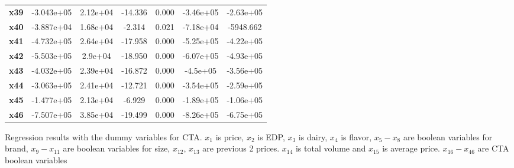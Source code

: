 \documentclass{article}
\begin{document}
\begin{center}
{\begin{tabular}{lcccccc}
\textbf{x39}   &   -3.043e+05  &     2.12e+04     &   -14.336  &         0.000        &    -3.46e+05    &    -2.63e+05     \\
\textbf{x40}   &   -3.887e+04  &     1.68e+04     &    -2.314  &         0.021        &    -7.18e+04    &    -5948.662     \\
\textbf{x41}   &   -4.732e+05  &     2.64e+04     &   -17.958  &         0.000        &    -5.25e+05    &    -4.22e+05     \\
\textbf{x42}   &   -5.503e+05  &      2.9e+04     &   -18.950  &         0.000        &    -6.07e+05    &    -4.93e+05     \\
\textbf{x43}   &   -4.032e+05  &     2.39e+04     &   -16.872  &         0.000        &     -4.5e+05    &    -3.56e+05     \\
\textbf{x44}   &   -3.063e+05  &     2.41e+04     &   -12.721  &         0.000        &    -3.54e+05    &    -2.59e+05     \\
\textbf{x45}   &   -1.477e+05  &     2.13e+04     &    -6.929  &         0.000        &    -1.89e+05    &    -1.06e+05     \\
\textbf{x46}   &   -7.507e+05  &     3.85e+04     &   -19.499  &         0.000        &    -8.26e+05    &    -6.75e+05     \\
\bottomrule
\end{tabular}}
\caption{Regression results with the dummy variables for CTA. $x_1$ is price, $x_2$ is EDP, $x_3$ is dairy, $x_4$ is flavor, $x_5-x_8$ are boolean variables for brand, $x_9-x_{11}$ are boolean variables for size, $x_{12}$, $x_{13}$ are previous 2 prices. $x_{14}$ is total volume and $x_{15}$ is average price. $x_{16}-x_{46}$ are CTA boolean variables}
\end{center}
\end{document}
